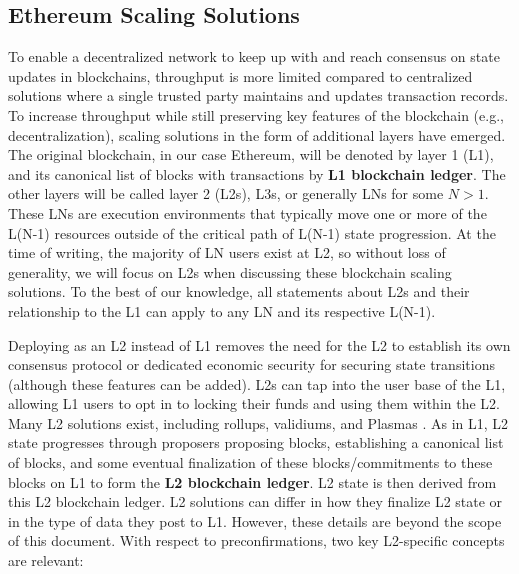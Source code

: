 \documentclass[a4paper]{article}
\theoremstyle{boldstyle}
\begin{document}
\subsection{Ethereum Scaling Solutions}\label{sec:intro_L2}
To enable a decentralized network to keep up with and reach consensus on state updates in blockchains, throughput is more limited compared to centralized solutions where a single trusted party maintains and updates transaction records. To increase throughput while still preserving key features of the blockchain (e.g., decentralization), scaling solutions in the form of additional layers have emerged. The original blockchain, in our case Ethereum, will be denoted by layer 1 (L1), and its canonical list of blocks with transactions by \textbf{L1 blockchain ledger}. The other layers will be called layer 2 (L2s), L3s, or generally LNs for some $N>1$. These LNs are execution environments that typically move one or more of the L(N-1) resources outside of the critical path of L(N-1) state progression. At the time of writing, the majority of LN users exist at L2, so without loss of generality, we will focus on L2s when discussing these blockchain scaling solutions. To the best of our knowledge, all statements about L2s and their relationship to the L1 can apply to any LN and its respective L(N-1). 
\par
Deploying as an L2 instead of L1 removes the need for the L2 to establish its own consensus protocol or dedicated economic security for securing state transitions (although these features can be added). L2s can tap into the user base of the L1, allowing L1 users to opt in to locking their funds and using them within the L2. Many L2 solutions exist, including rollups, validiums, and Plasmas \cite{L2_versus_execution_sharding}. 
As in L1, L2 state progresses through proposers proposing blocks, establishing a canonical list of blocks, and some eventual finalization of these blocks/commitments to these blocks on L1 to form the \textbf{L2 blockchain ledger}. L2 state is then derived from this L2 blockchain ledger. L2 solutions can differ in how they finalize L2 state or in the type of data they post to L1. However, these details are beyond the scope of this document. With respect to preconfirmations, two key L2-specific concepts are relevant:
\end{document}
